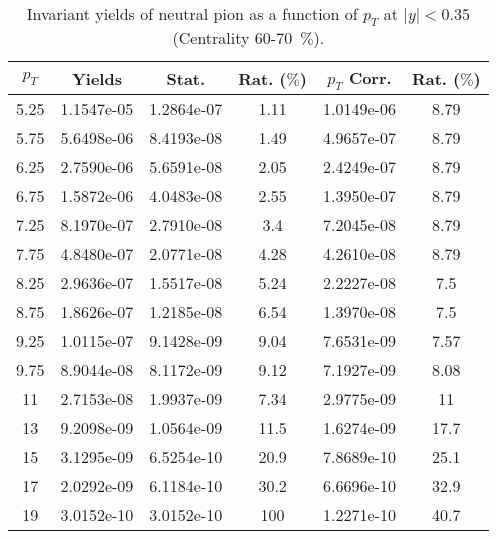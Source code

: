             
\begin{table}[!htb]
\centering
\begin{tabular}{|c|c|c|c|c|c|}
\hline
$p_{T}$ & Yields & Stat. & Rat. ($\%$) & $p_{T}$ Corr. & Rat. ($\%$) \\
\hline
5.25 & 1.1547e-05 & 1.2864e-07 & 1.11 & 1.0149e-06 & 8.79 \\ 
5.75 & 5.6498e-06 & 8.4193e-08 & 1.49 & 4.9657e-07 & 8.79 \\ 
6.25 & 2.7590e-06 & 5.6591e-08 & 2.05 & 2.4249e-07 & 8.79 \\ 
6.75 & 1.5872e-06 & 4.0483e-08 & 2.55 & 1.3950e-07 & 8.79 \\ 
7.25 & 8.1970e-07 & 2.7910e-08 & 3.4 & 7.2045e-08 & 8.79 \\ 
7.75 & 4.8480e-07 & 2.0771e-08 & 4.28 & 4.2610e-08 & 8.79 \\ 
8.25 & 2.9636e-07 & 1.5517e-08 & 5.24 & 2.2227e-08 & 7.5 \\ 
8.75 & 1.8626e-07 & 1.2185e-08 & 6.54 & 1.3970e-08 & 7.5 \\ 
9.25 & 1.0115e-07 & 9.1428e-09 & 9.04 & 7.6531e-09 & 7.57 \\ 
9.75 & 8.9044e-08 & 8.1172e-09 & 9.12 & 7.1927e-09 & 8.08 \\ 
11 & 2.7153e-08 & 1.9937e-09 & 7.34 & 2.9775e-09 & 11 \\ 
13 & 9.2098e-09 & 1.0564e-09 & 11.5 & 1.6274e-09 & 17.7 \\ 
15 & 3.1295e-09 & 6.5254e-10 & 20.9 & 7.8689e-10 & 25.1 \\ 
17 & 2.0292e-09 & 6.1184e-10 & 30.2 & 6.6696e-10 & 32.9 \\ 
19 & 3.0152e-10 & 3.0152e-10 & 100 & 1.2271e-10 & 40.7 \\ 
\hline
\end{tabular}
\caption{Invariant yields of neutral pion as a function of $p_{T}$ at $|y|<0.35$ (Centrality 60-70~$\%$).}
\end{table}
            
